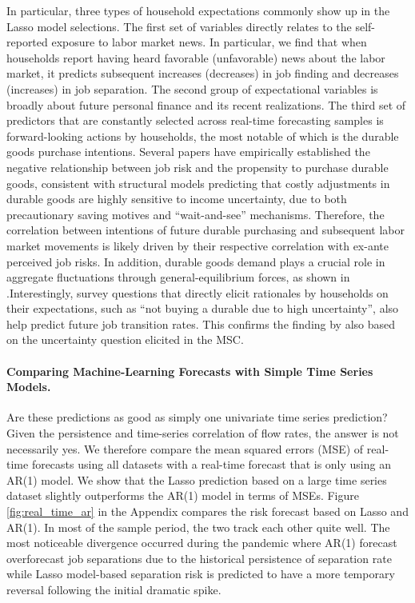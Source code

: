 In particular, three types of household expectations commonly show up in the Lasso model selections. The first set of variables directly relates to the self-reported exposure to labor market news. In particular, we find that when households report having heard favorable (unfavorable) news about the labor market, it predicts subsequent increases (decreases) in job finding and decreases (increases) in job separation. The second group of expectational variables is broadly about future personal finance and its recent realizations. The third set of predictors that are constantly selected across real-time forecasting samples is forward-looking actions by households, the most notable of which is the durable goods purchase intentions. Several papers \citep{carroll1997unemployment,harmenberg2021consumption} have empirically established the negative relationship between job risk and the propensity to purchase durable goods, consistent with structural models predicting that costly adjustments in durable goods are highly sensitive to income uncertainty, due to both precautionary saving motives and ``wait-and-see'' mechanisms. Therefore, the correlation between intentions of future durable purchasing and subsequent labor market movements is likely driven by their respective correlation with ex-ante perceived job risks. In addition, durable goods demand plays a crucial role in aggregate fluctuations through general-equilibrium forces, as shown in \citet{mckay2021lumpy}.Interestingly, survey questions that directly elicit rationales by households on their expectations, such as ``not buying a durable due to high uncertainty'', also help predict future job transition rates. This confirms the finding by \cite{leduc2016uncertainty} also based on the uncertainty question elicited in the MSC. 

\paragraph{Comparing Machine-Learning Forecasts with Simple Time Series Models.}
Are these predictions as good as simply one univariate time series prediction? Given the persistence and time-series correlation of flow rates, the answer is not necessarily yes. We therefore compare the mean squared errors (MSE) of real-time forecasts using all datasets with a real-time forecast that is only using an AR(1) model. We show that the Lasso prediction based on a large time series dataset slightly outperforms the AR(1) model in terms of MSEs. Figure \ref{fig:real_time_ar} in the Appendix compares the risk forecast based on Lasso and AR(1). In most of the sample period, the two track each other quite well. The most noticeable divergence occurred during the pandemic where AR(1) forecast overforecast job separations due to the historical persistence of separation rate while Lasso model-based separation risk is predicted to have a more temporary reversal following the initial dramatic spike.


